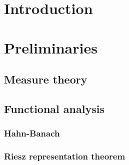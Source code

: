 \documentclass[a4paper,12pt,twoside,BCOR=10mm]{scrbook}
\begin{document}
\setcounter{page}{1}
\chapter{Introduction}



\chapter{Preliminaries}
\section{Measure theory}
\section{Functional analysis}
\subsection{Hahn-Banach}
\subsection{Riesz representation theorem}
\end{document}

